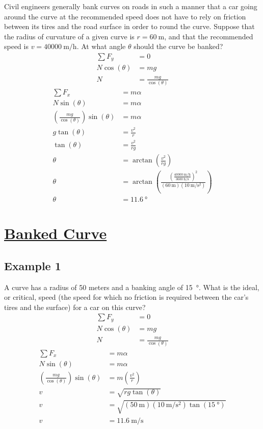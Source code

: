 \documentclass{article}
\begin{document}
Civil engineers generally bank curves on roads in such a manner that a car going around the curve at the recommended speed does not have to rely on friction between its tires and the road surface in order to round the curve. Suppose that the radius of curvature of a given curve is $ r = \SI{60}{\meter} $, and that the recommended speed is $ v=\SI{40000}{\meter \per \hour} $. At what angle $\theta$ should the curve be banked? 
\begin{align*}
	\sum F_y & = 0 \\
	N\cos(\theta) & = mg \\
	N & = \frac{ mg }{ \cos(\theta) }
\end{align*}
\begin{align*}
	\sum F_x & = m\alpha \\
	N\sin(\theta) & = m\alpha \\
	\left( \frac{ mg }{ \cos(\theta) } \right) \sin(\theta) & = m\alpha \\
	g\tan(\theta) & = \frac{ v^2 }{ r } \\
	\tan(\theta) & = \frac{ v^2 }{ rg } \\
	\theta & = \arctan \left( \frac{ v^2 }{ rg } \right) \\
	\theta & = \arctan \left( \frac{ \left( \frac{ \SI{40000}{\meter \per \hour} }{ \SI{3600}{\hour \per \second} } \right)^2 }{ (\SI{60}{\meter})(\SI{10}{\meter \per \second \squared}) } \right) \\
	\theta & = \SI{11.6}{\degree}
\end{align*}

\section{
	\href{http://www.batesville.k12.in.us/physics/phynet/mechanics/circular\%20motion/banked_with_friction.htm}{Banked Curve}
}

\subsection{Example 1}
A curve has a radius of 50 meters and a banking angle of \SI{15}{\degree}. What is the ideal, or critical, speed (the speed for which no friction is required between the car's tires and the surface) for a car on this curve?
\begin{align*}
	\sum F_y & = 0 \\
	N\cos(\theta) & = mg \\
	N & = \frac{ mg }{ \cos(\theta) }
\end{align*}
\begin{align*}
	\sum F_x & = m\alpha \\
	N\sin(\theta) & = m\alpha \\
	\left( \frac{ mg }{ \cos(\theta) } \right) \sin(\theta) & = m \left( \frac{ v^2 }{ r } \right) \\
	v & = \sqrt{ rg\tan(\theta) } \\
	v & = \sqrt{ (\SI{50}{\meter})(\SI{10}{\meter \per \second \squared})\tan(\SI{15}{\degree}) } \\
	v & = \SI{11.6}{\meter \per \second}
\end{align*}
\end{document}
